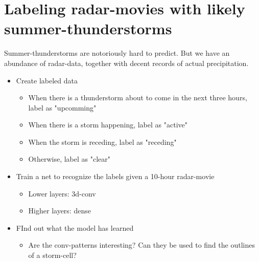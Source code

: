 \section{Labeling radar-movies with likely summer-thunderstorms}

Summer-thunderstorms are notoriously hard to predict. But we have an abundance of radar-data, together with decent records of actual precipitation.


\begin{itemize}
  \item Create labeled data
    \begin{itemize}
      \item When there is a thunderstorm about to come in the next three hours, label as "upcomming"
      \item When there is a storm happening, label as "active"
      \item When the storm is receding, label as "receding"
      \item Otherwise, label as "clear"
    \end{itemize}
   \item Train a net to recognize the labels given a 10-hour radar-movie
    \begin{itemize}
      \item Lower layers: 3d-conv
      \item Higher layers: dense
    \end{itemize}
   \item FInd out what the model has learned
    \begin{itemize}
      \item Are the conv-patterns interesting? Can they be used to find the outlines of a storm-cell?
    \end{itemize}
\end{itemize}
